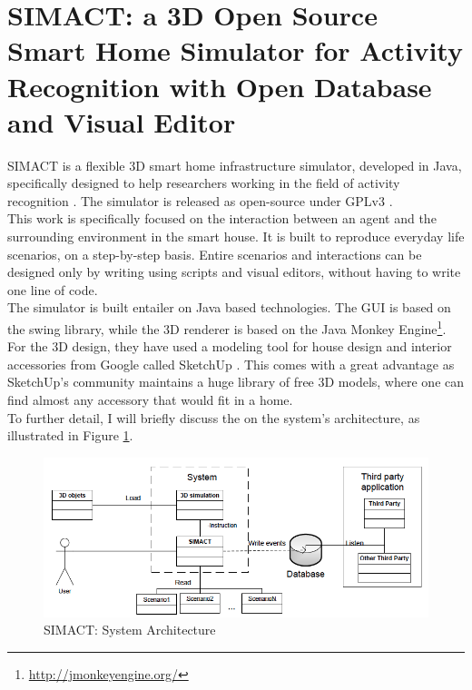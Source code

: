 \section{SIMACT: a 3D Open Source Smart Home Simulator for Activity Recognition with Open Database and Visual Editor}\label{sec:simact}

SIMACT is a flexible 3D smart home infrastructure simulator, developed in Java, specifically designed to help researchers working in the field of activity recognition \cite{bouchard2012simact}. The simulator is released as open-source \cite{bouchard:simact:Online} under GPLv3 \cite{gpl:v3}.\\

This work is specifically focused on the interaction between an agent and the surrounding environment in the smart house. It is built to reproduce everyday life scenarios, on a step-by-step basis. Entire scenarios and interactions can be designed only by writing using scripts and visual editors, without having to write one line of code.\\

The simulator is built entailer on Java based technologies. The GUI is based on the swing library, while the 3D renderer is based on the Java Monkey Engine\footnote{\url{http://jmonkeyengine.org/}}. For the 3D design, they have used a modeling tool for house design and interior accessories from Google called SketchUp \cite{sketchup:online}. This comes with a great advantage as SketchUp's community maintains a huge library of free 3D models, where one can find almost any accessory that would fit in a home.\\

To further detail, I will briefly discuss the on the system's architecture, as illustrated in Figure \ref{fig:simact_architecture}.

\begin{figure}[H]
	\centering
	\includegraphics[width=\linewidth]{gfx/Chapter2/simact_architecture}
	\caption{SIMACT: System Architecture}
	\label{fig:simact_architecture}
\end{figure}

